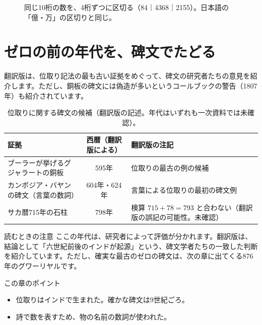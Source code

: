 \documentclass[a4paper,11pt,openany]{ltjsbook}
\begin{document}
\begin{figure}[htbp]
\centering
{}
\caption{同じ10桁の数を、4桁ずつに区切る（84｜4368｜2155）。日本語の「億・万」の区切りと同じ。}
\end{figure}

\section{ゼロの前の年代を、碑文でたどる}

翻訳版は、位取り記法の最も古い証拠をめぐって、碑文の研究者たちの意見を紹介します。ただし、銅板の碑文には偽造が多いというコールブックの警告（1807年）も紹介されています。

\begin{table}[htbp]
\centering
\begin{tabular}{p{4.6cm}cp{5cm}}
\toprule
証拠 & 西暦（翻訳版による） & 翻訳版の注記\\
\midrule
ブーラーが挙げるグジャラートの銅板 & 595年 & 位取りの最古の例の候補\\
カンボジア・バヤンの碑文（言葉の数詞） & 604年・624年 & 言葉による位取りの最初の碑文例\\
サカ暦715年の石柱 & 798年 & 検算 $715+78=793$ と合わない（翻訳版の誤記の可能性。未確認）\\
\bottomrule
\end{tabular}
\caption{位取りに関する碑文の候補（翻訳版の記述。年代はいずれも一次資料では未確認）。}
\end{table}

\begin{notebox}{読むときの注意}
ここの年代は、研究者によって評価が分かれます。翻訳版は、結論として「六世紀前後のインドが起源」という、碑文学者たちの一致した判断を紹介しています。ただし、確実な最古のゼロの碑文は、次の章に出てくる876年のグワーリヤルです。
\end{notebox}

\begin{pointbox}{この章のポイント}
\begin{itemize}[leftmargin=1.5em]
\item 位取りはインドで生まれた。確かな碑文は9世紀ごろ。
\item 詩で数を表すため、物の名前の数詞が使われた。
\end{itemize}
\end{pointbox}
\end{document}
